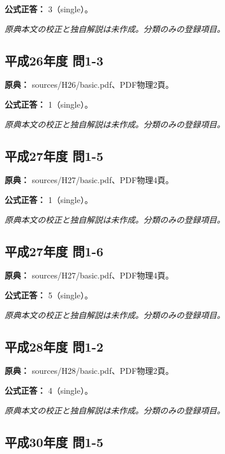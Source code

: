 \textbf{公式正答：} 3（single）。

\par\textit{原典本文の校正と独自解説は未作成。分類のみの登録項目。}

\subsection{平成26年度 問1-3}
\label{q:h26-reg-basic-1-3}

\noindent\textbf{原典：} sources/H26/basic.pdf、PDF物理2頁。

\textbf{公式正答：} 1（single）。

\par\textit{原典本文の校正と独自解説は未作成。分類のみの登録項目。}

\subsection{平成27年度 問1-5}
\label{q:h27-reg-basic-1-5}

\noindent\textbf{原典：} sources/H27/basic.pdf、PDF物理4頁。

\textbf{公式正答：} 1（single）。

\par\textit{原典本文の校正と独自解説は未作成。分類のみの登録項目。}

\subsection{平成27年度 問1-6}
\label{q:h27-reg-basic-1-6}

\noindent\textbf{原典：} sources/H27/basic.pdf、PDF物理4頁。

\textbf{公式正答：} 5（single）。

\par\textit{原典本文の校正と独自解説は未作成。分類のみの登録項目。}

\subsection{平成28年度 問1-2}
\label{q:h28-reg-basic-1-2}

\noindent\textbf{原典：} sources/H28/basic.pdf、PDF物理2頁。

\textbf{公式正答：} 4（single）。

\par\textit{原典本文の校正と独自解説は未作成。分類のみの登録項目。}

\subsection{平成30年度 問1-5}
\label{q:h30-reg-basic-1-5}

